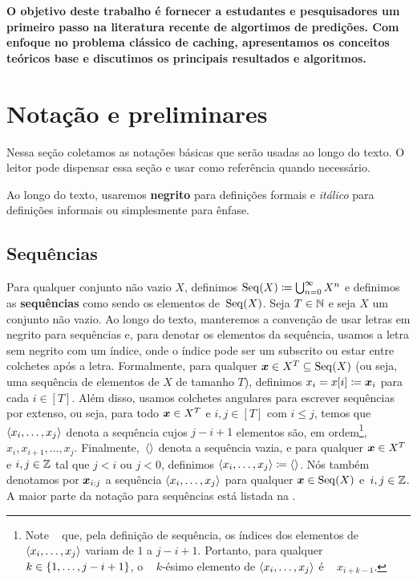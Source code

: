 
\textbf{O objetivo deste trabalho é fornecer a estudantes e pesquisadores um primeiro passo na literatura recente de algortimos de predições. Com enfoque no problema clássico de caching, apresentamos os conceitos teóricos base e discutimos os principais resultados e algoritmos.}

\section{Notação e preliminares}

Nessa seção coletamos as notações básicas que serão usadas ao longo do texto. O leitor pode dispensar essa seção e usar como referência quando necessário.

Ao longo do texto, usaremos \textbf{negrito} para definições formais e \textit{itálico} para definições informais ou simplesmente para ênfase.

\subsection{Sequências}

Para qualquer conjunto não vazio \(X\), definimos \(\operatorname{Seq}(X) \coloneqq \bigcup_{n = 0}^\infty X^n\) e definimos as \textbf{sequências} como sendo os elementos de~\(\operatorname{Seq}(X)\). Seja \(T \in \mathbb{N}\) e seja \(X\) um conjunto não vazio. Ao longo do texto, manteremos a convenção de usar letras em negrito para sequências e, para denotar os elementos da sequência, usamos a letra sem negrito com um índice, onde o índice pode ser um subscrito ou estar entre colchetes após a letra. Formalmente, para qualquer \(\bm{x} \in X^T \subseteq \operatorname{Seq}(X)\) (ou seja, uma sequência de elementos de \(X\) de tamanho \(T\)), definimos \(x_i = x[i] \coloneqq \bm{x}_i\) para cada \(i \in [T]\). Além disso, usamos colchetes angulares para escrever sequências por extenso, ou seja, para todo \(\bm{x} \in X^T\) e \(i,j \in [T]\) com \(i \leq j\), temos que \(\langle x_i, \dotsc, x_j\rangle\) denota a sequência cujos \(j - i + 1\) elementos são, em ordem\footnote{Note   que, pela definição de sequência, os índices dos elementos de   \(\langle x_i, \dotsc, x_j\rangle\) variam de \(1\) a \(j - i +   1\). Portanto, para qualquer \(k \in \{1, \dotsc ,j - i + 1\}\), o   \(k\)-ésimo elemento de \(\langle x_i, \dotsc, x_j\rangle\) é   \(x_{i + k - 1}\). }, \(x_i, x_{i+1}, \dotsc, x_{j}\). Finalmente,~\(\langle\rangle\) denota a sequência vazia, e para qualquer \(\bm{x} \in X^T\) e \(i,j \in \mathbb{Z}\) tal que \(j < i\) ou \(j < 0\), definimos \(\langle x_i, \dotsc, x_j\rangle \coloneqq \langle\rangle\). Nós também denotamos por \(\bm{x}_{i:j}\) a sequência \(\langle x_i, \dotsc, x_j\rangle\) para qualquer \(\bm{x} \in \operatorname{Seq}(X)\) e~\(i,j \in \mathbb{Z}\). A maior parte da notação para sequências está listada na .

